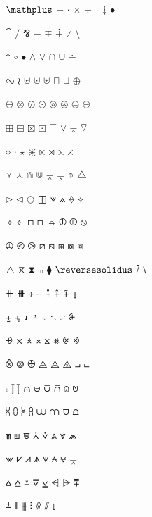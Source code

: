 \documentclass{article}
\begin{document}
$\mathplus$ $\pm$ $\cdotp$ $\times$ $\div$ $\dagger$ $\ddagger$ $\smblkcircle$ \par
$\tieconcat$ $\fracslash$ $\upand$ $\minus$ $\mp$ $\dotplus$ $\divslash$ $\setminus$ \par
$\ast$ $\vysmwhtcircle$ $\vysmblkcircle$ $\wedge$ $\vee$ $\cap$ $\cup$ $\dotminus$ \par
$\invlazys$ $\wr$ $\cupleftarrow$ $\cupdot$ $\uplus$ $\sqcap$ $\sqcup$ $\oplus$ \par
$\ominus$ $\otimes$ $\oslash$ $\odot$ $\circledcirc$ $\circledast$ $\circledequal$ $\circleddash$ \par
$\boxplus$ $\boxminus$ $\boxtimes$ $\boxdot$ $\intercal$ $\veebar$ $\barwedge$ $\barvee$ \par
$\smwhtdiamond$ $\cdot$ $\star$ $\divideontimes$ $\ltimes$ $\rtimes$ $\leftthreetimes$ $\rightthreetimes$ \par
$\curlyvee$ $\curlywedge$ $\Cap$ $\Cup$ $\varbarwedge$ $\vardoublebarwedge$ $\obar$ $\bigtriangleup$ \par
$\triangleright$ $\triangleleft$ $\mdlgwhtcircle$ $\boxbar$ $\veedot$ $\wedgedot$ $\lozengeminus$ $\concavediamond$ \par
$\concavediamondtickleft$ $\concavediamondtickright$ $\whitesquaretickleft$ $\whitesquaretickright$ $\circlehbar$ $\circledvert$ $\circledparallel$ $\obslash$ \par
$\operp$ $\olessthan$ $\ogreaterthan$ $\boxdiag$ $\boxbslash$ $\boxast$ $\boxcircle$ $\boxbox$ \par
$\triangleserifs$ $\hourglass$ $\blackhourglass$ $\shuffle$ $\mdlgblklozenge$ $\reversesolidus$ $\dsol$ $\rsolbar$ \par
$\doubleplus$ $\tripleplus$ $\tplus$ $\tminus$ $\ringplus$ $\plushat$ $\simplus$ $\plusdot$ \par
$\plussim$ $\plussubtwo$ $\plustrif$ $\commaminus$ $\minusdot$ $\minusfdots$ $\minusrdots$ $\opluslhrim$ \par
$\oplusrhrim$ $\vectimes$ $\dottimes$ $\timesbar$ $\btimes$ $\smashtimes$ $\otimeslhrim$ $\otimesrhrim$ \par
$\otimeshat$ $\Otimes$ $\odiv$ $\triangleplus$ $\triangleminus$ $\triangletimes$ $\intprod$ $\intprodr$ \par
$\fcmp$ $\amalg$ $\capdot$ $\uminus$ $\barcup$ $\barcap$ $\capwedge$ $\cupvee$ \par
$\cupovercap$ $\capovercup$ $\cupbarcap$ $\capbarcup$ $\twocups$ $\twocaps$ $\closedvarcup$ $\closedvarcap$ \par
$\Sqcap$ $\Sqcup$ $\closedvarcupsmashprod$ $\wedgeodot$ $\veeodot$ $\Wedge$ $\Vee$ $\wedgeonwedge$ \par
$\veeonvee$ $\bigslopedvee$ $\bigslopedwedge$ $\wedgemidvert$ $\veemidvert$ $\midbarwedge$ $\midbarvee$ $\doublebarwedge$ \par
$\wedgebar$ $\wedgedoublebar$ $\varveebar$ $\doublebarvee$ $\veedoublebar$ $\dsub$ $\rsub$ $\eqqplus$ \par
$\pluseqq$ $\interleave$ $\nhVvert$ $\threedotcolon$ $\trslash$ $\sslash$ $\talloblong$\par
\end{document}
